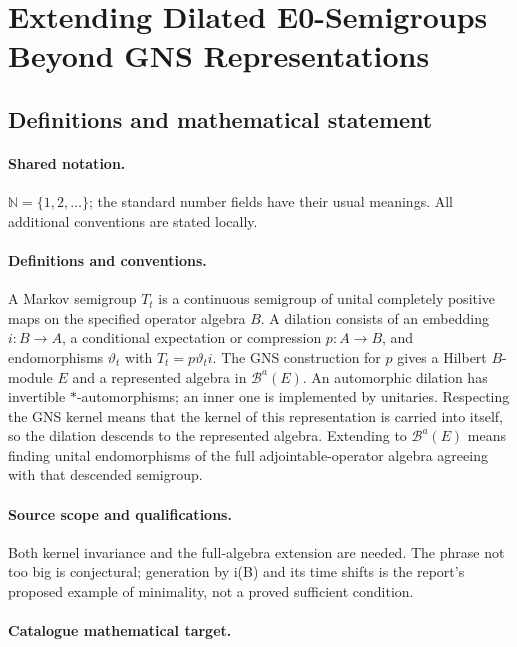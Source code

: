 \documentclass[11pt]{article}
\begin{document}
\section{Extending Dilated E0-Semigroups Beyond GNS Representations}\label{statement}

\subsection{Definitions and mathematical statement}

\paragraph{Shared notation.}$\mathbb N=\{1,2,\ldots\}$; the standard number fields have their usual meanings. All additional conventions are stated locally.


\paragraph{Definitions and conventions.} A Markov semigroup $T_t$ is a continuous semigroup of unital completely positive maps on the specified operator algebra $B$. A dilation consists of an embedding $i:B\to A$, a conditional expectation or compression $p:A\to B$, and endomorphisms $\vartheta_t$ with $T_t=p\vartheta_t i$. The GNS construction for $p$ gives a Hilbert $B$-module $E$ and a represented algebra in $\mathcal B^a(E)$. An automorphic dilation has invertible $*$-automorphisms; an inner one is implemented by unitaries. Respecting the GNS kernel means that the kernel of this representation is carried into itself, so the dilation descends to the represented algebra. Extending to $\mathcal B^a(E)$ means finding unital endomorphisms of the full adjointable-operator algebra agreeing with that descended semigroup.

\paragraph{Source scope and qualifications.} Both kernel invariance and the full-algebra extension are needed. The phrase not too big is conjectural; generation by i(B) and its time shifts is the report's proposed example of minimality, not a proved sufficient condition.

\paragraph{Catalogue mathematical target.}
\end{document}
